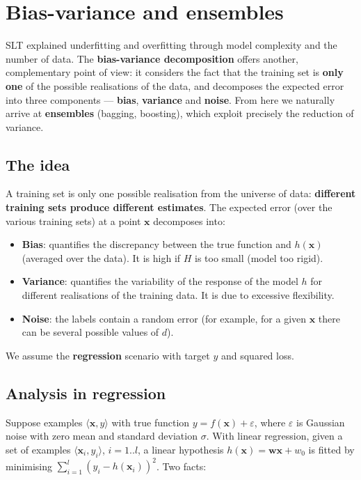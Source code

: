 \chapter{Bias-variance and ensembles}\label{ch-15}

SLT explained underfitting and overfitting through model complexity and
the number of data. The \textbf{bias-variance decomposition} offers
another, complementary point of view: it considers the fact that the
training set is \textbf{only one} of the possible realisations of the
data, and decomposes the expected error into three components ---
\textbf{bias}, \textbf{variance} and \textbf{noise}. From here we
naturally arrive at \textbf{ensembles} (bagging, boosting), which
exploit precisely the reduction of variance.

\section{The idea}\label{lidea}

A training set is only one possible realisation from the universe of
data: \textbf{different training sets produce different estimates}. The
expected error (over the various training sets) at a point
\(\mathbf{x}\) decomposes into:

\begin{itemize}
\tightlist
\item
  \textbf{Bias}: quantifies the discrepancy between the true function
  and \(h(\mathbf{x})\) (averaged over the data). It is high if \(H\) is
  too small (model too rigid).
\item
  \textbf{Variance}: quantifies the variability of the response of the
  model \(h\) for different realisations of the training data. It is
  due to excessive flexibility.
\item
  \textbf{Noise}: the labels contain a random error (for example, for a
  given \(\mathbf{x}\) there can be several possible values of \(d\)).
\end{itemize}

We assume the \textbf{regression} scenario with target \(y\) and
squared loss.

\section{Analysis in regression}\label{analisi-nella-regressione}

Suppose examples \(\langle \mathbf{x}, y\rangle\) with true function
\(y = f(\mathbf{x}) + \varepsilon\), where \(\varepsilon\) is Gaussian
noise with zero mean and standard deviation \(\sigma\). With linear
regression, given a set of examples \(\langle\mathbf{x}_i, y_i\rangle\),
\(i = 1..l\), a linear hypothesis \(h(\mathbf{x}) = \mathbf{w}\mathbf{x} + w_0\)
is fitted by minimising \(\sum_{i=1}^l (y_i - h(\mathbf{x}_i))^2\). Two
facts:

